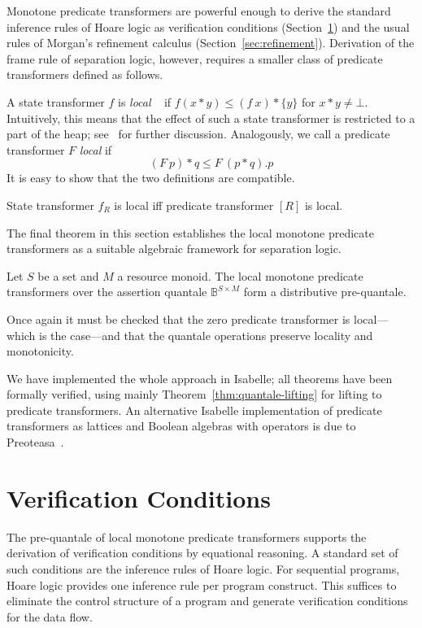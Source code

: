 \documentclass[twoside,runningheads,envcountsame,envcountsect,oribibl,orivec]{llncs}
\begin{document}
Monotone predicate transformers are powerful enough to derive the
standard inference rules of Hoare logic as verification conditions
(Section~\ref{sec:verification}) and the usual rules of Morgan's
refinement calculus (Section~\ref{sec:refinement}). Derivation of the
frame rule of separation logic, however, requires a smaller class of
predicate transformers defined as follows.

A state transformer $f$ is \emph{local} ~\cite{COY07} if $f(x \ast y)
\le (f\ x) \ast \{y\}$ for $x \ast y\neq \bot$. Intuitively, this
means that the effect of such a state transformer is restricted to a
part of the heap; see~\cite{COY07} for further discussion.
Analogously, we call a predicate transformer $F$ \emph{local} if
\begin{equation*}
(F\ p) \ast q \le F\ (p\ast q). p
\end{equation*}
It is easy to show that the two definitions are compatible.
\begin{lemma}\label{lem:local-prop2}
  State transformer $f_R$ is local iff predicate transformer
  $[R]$ is local.
\end{lemma}

The final theorem in this section establishes the local monotone
predicate transformers as a suitable algebraic framework for
separation logic.
\begin{theorem}\label{prop:pt-loc-quantale}
  Let $S$ be a set and $M$ a resource monoid. The local monotone
  predicate transformers over the assertion quantale
  $\mathbb{B}^{S\times M}$ form a distributive pre-quantale.
\end{theorem}
Once again it must be checked that the zero predicate transformer is
local---which is the case---and that the quantale operations preserve
locality and monotonicity.

We have implemented the whole approach in Isabelle; all theorems have
been formally verified, using mainly
Theorem~\ref{thm:quantale-lifting} for lifting to predicate
transformers. An alternative Isabelle implementation of predicate
transformers as lattices and Boolean algebras with operators is due to
Preoteasa~\cite{Preoteasa11}.



\section{Verification Conditions} \label{sec:verification}

The pre-quantale of local monotone predicate transformers supports the
derivation of verification conditions by equational reasoning. A
standard set of such conditions are the inference rules of Hoare
logic. For sequential programs, Hoare logic provides one inference
rule per program construct. This suffices to eliminate the control
structure of a program and generate verification conditions for the
data flow.
\end{document}

